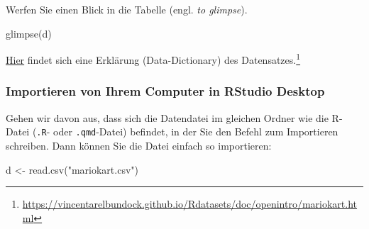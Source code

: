 \documentclass[
  a4paper,
]{scrbook}
\newenvironment{Shaded}{\begin{snugshade}}{\end{snugshade}}
\newcommand{\FunctionTok}[1]{\textcolor[rgb]{0.28,0.35,0.67}{#1}}
\newcommand{\NormalTok}[1]{\textcolor[rgb]{0.00,0.23,0.31}{#1}}
\newcommand{\OtherTok}[1]{\textcolor[rgb]{0.00,0.23,0.31}{#1}}
\newcommand{\StringTok}[1]{\textcolor[rgb]{0.13,0.47,0.30}{#1}}
\theoremstyle{definition}
\theoremstyle{definition}
\theoremstyle{definition}
\theoremstyle{remark}
\begin{document}
Werfen Sie einen Blick in die Tabelle (engl. \emph{to glimpse}).

\begin{Shaded}
\begin{Highlighting}[]
\FunctionTok{glimpse}\NormalTok{(d)}
\end{Highlighting}
\end{Shaded}

\href{https://vincentarelbundock.github.io/Rdatasets/doc/openintro/mariokart.html}{Hier}
findet sich eine Erklärung (Data-Dictionary) des Datensatzes.\footnote{\url{https://vincentarelbundock.github.io/Rdatasets/doc/openintro/mariokart.html}}

\subsubsection{Importieren von Ihrem Computer in RStudio
Desktop}\label{importieren-von-ihrem-computer-in-rstudio-desktop}

Gehen wir davon aus, dass sich die Datendatei im gleichen Ordner wie die
R-Datei (\texttt{.R}- oder \texttt{.qmd}-Datei) befindet, in der Sie den
Befehl zum Importieren schreiben. Dann können Sie die Datei einfach so
importieren:

\begin{Shaded}
\begin{Highlighting}[]
\NormalTok{d }\OtherTok{\textless{}{-}} \FunctionTok{read.csv}\NormalTok{(}\StringTok{"mariokart.csv"}\NormalTok{)}
\end{Highlighting}
\end{Shaded}
\end{document}
